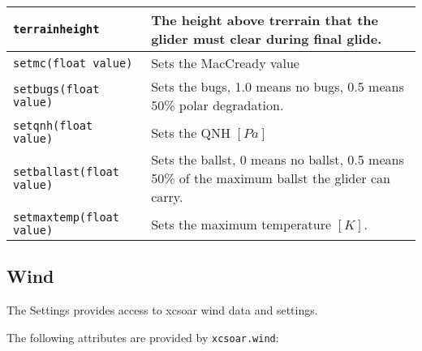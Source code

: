 \begin{maxipage}
\begin{tabularx}{1.9\textwidth}{l|X}
\hline

\verb|terrainheight| & The height above trerrain that the glider must clear during
final glide.\\

\hline

\verb|setmc(float value)| &  Sets the MacCready value\\

\hline

\verb|setbugs(float value)| & Sets the bugs, 1.0 means no bugs, 0.5 means 50\% polar
degradation.\\

\hline

\verb|setqnh(float value)| & Sets the QNH $[{Pa}]$\\

\hline

\verb|setballast(float value)| & Sets the ballst, 0 means no ballst, 0.5 means 50\%
of the maximum \newline ballst the glider can carry.\\

\hline

\verb|setmaxtemp(float value)| & Sets the maximum temperature $[{K}]$.\\

\hline

\end{tabularx}
\end{maxipage}

\subsection{Wind}\label{sec:lua.wind}

The Settings provides access to xcsoar wind data and settings.

The following attributes are provided by \verb|xcsoar.wind|:

